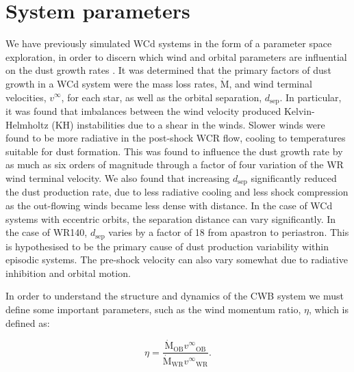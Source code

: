 \documentclass[fleqn,usenatbib]{mnras}
\newcommand{\swr}{\ensuremath{_{\text{WR}}}}
\newcommand{\sob}{\ensuremath{_{\text{OB}}}}
\newcommand{\rms}[1]{\ensuremath{_{\text{#1}}}}
\newcommand{\mdot}{\dot{\text{M}}}
\newcommand{\dsep}{d\rms{sep}}
\begin{document}
\section{System parameters}
\label{sec:paper2-wr140}

We have previously simulated WCd systems in the form of a parameter space exploration, in order to discern which wind and orbital parameters are influential on the dust growth rates \citep{eatsonExplorationDustGrain2022}.
It was determined that the primary factors of dust growth in a WCd system were the mass loss rates, $\mdot$, and wind terminal velocities, $v^\infty$, for each star, as well as the orbital separation, $d\rms{sep}$.
In particular, it was found that imbalances between the wind velocity produced Kelvin-Helmholtz (KH) instabilities due to a shear in the winds.
Slower winds were found to be more radiative in the post-shock WCR flow, cooling to temperatures suitable for dust formation.
This was found to influence the dust growth rate by as much as six orders of magnitude through a factor of four variation of the WR wind terminal velocity.
We also found that increasing $d\rms{sep}$ significantly reduced the dust production rate, due to less radiative cooling and less shock compression as the out-flowing winds became less dense with distance.
In the case of WCd systems with eccentric orbits, the separation distance can vary significantly.
In the case of WR140, $\dsep$ varies by a factor of 18 from apastron to periastron.
This is hypothesised to be the primary cause of dust production variability within episodic systems.
The pre-shock velocity can also vary somewhat due to radiative inhibition and orbital motion.

In order to understand the structure and dynamics of the CWB system we must define some important parameters, such as the wind momentum ratio, $\eta$, which is defined as:

\begin{equation}
  \eta = \frac{\mdot\sob v^\infty\sob}{\mdot\swr v^\infty\swr} .
\end{equation}
\end{document}
